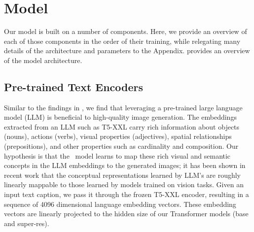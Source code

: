 

\section{Model}
\label{sec:model}
Our model is built on a number of components. Here, we provide an overview of each of those components in the order of their training, while relegating many details of the architecture and parameters to the Appendix.  provides an overview of the model architecture. 

\subsection{Pre-trained Text Encoders}
Similar to the findings in \citep{imagen}, we find that leveraging a pre-trained large language model (LLM) is beneficial to high-quality image generation. The embeddings extracted from an LLM such as T5-XXL \citep{t5xxl} carry rich information about objects (nouns), actions (verbs), visual properties (adjectives), spatial relationships (prepositions), and other properties such as cardinality and composition. Our hypothesis is that the \name~model learns to map these rich visual and semantic concepts in the LLM embeddings to the generated images; it has been shown in recent work \citep{merullo2022linearly} that the conceptual representations learned by LLM's are roughly linearly mappable to those learned by models trained on vision tasks. Given an input text caption, we pass it through the frozen T5-XXL encoder, resulting in a sequence of 4096 dimensional language embedding vectors. These embedding vectors are linearly projected to the hidden size of our Transformer models (base and super-res).

